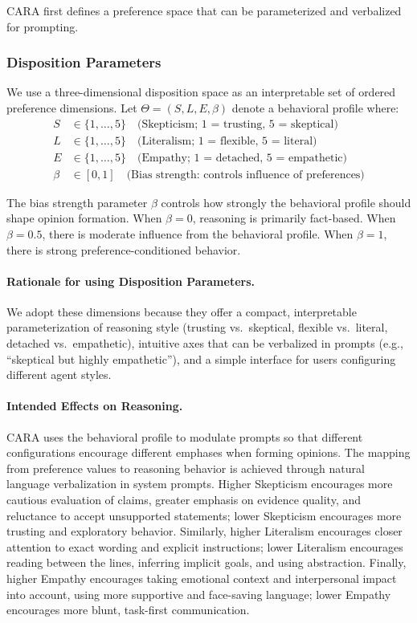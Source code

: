 CARA first defines a preference space that can be parameterized and verbalized for prompting.

\subsubsection{Disposition Parameters}

We use a three-dimensional disposition space as an interpretable set of ordered preference dimensions. Let $\Theta = (S, L, E, \beta)$ denote a behavioral profile where:
\begin{align}
S &\in \{1,\ldots,5\} \quad \text{(Skepticism; 1 = trusting, 5 = skeptical)} \\
L &\in \{1,\ldots,5\} \quad \text{(Literalism;  1 = flexible, 5 = literal)} \\
E &\in \{1,\ldots,5\} \quad \text{(Empathy; 1 = detached, 5 = empathetic)} \\
\beta &\in [0,1] \quad \text{(Bias strength: controls influence of preferences)}
\end{align}

The bias strength parameter $\beta$ controls how strongly the behavioral profile should shape opinion formation. When $\beta = 0$, reasoning is primarily fact-based. When $\beta = 0.5$, there is moderate influence from the behavioral profile. When $\beta = 1$, there is strong preference-conditioned behavior.

\paragraph{Rationale for using Disposition Parameters.}

We adopt these dimensions because they offer a compact, interpretable parameterization of reasoning style (trusting vs.\ skeptical, flexible vs.\ literal, detached vs.\ empathetic), intuitive axes that can be verbalized in prompts (e.g., ``skeptical but highly empathetic''), and a simple interface for users configuring different agent styles.

\paragraph{Intended Effects on Reasoning.}

CARA uses the behavioral profile to modulate prompts so that different configurations encourage different emphases when forming opinions. The mapping from preference values to reasoning behavior is achieved through natural language verbalization in system prompts. Higher Skepticism encourages more cautious evaluation of claims, greater emphasis on evidence quality, and reluctance to accept unsupported statements; lower Skepticism encourages more trusting and exploratory behavior. Similarly, higher Literalism encourages closer attention to exact wording and explicit instructions; lower Literalism encourages reading between the lines, inferring implicit goals, and using abstraction. Finally, higher Empathy encourages taking emotional context and interpersonal impact into account, using more supportive and face-saving language; lower Empathy encourages more blunt, task-first communication.

